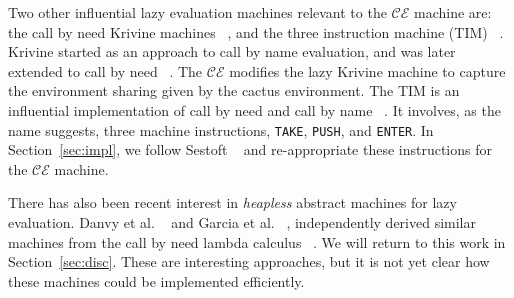 Two other influential lazy evaluation machines relevant to the $\mathcal{CE}$
machine are: the call by need Krivine machines ~\cite{lkm,
krivine2007call,sestoft}, and the three instruction machine (TIM) ~\cite{TIM}.
Krivine started as an approach to call by name evaluation, and was later
extended to call by need ~\cite{krivine2007call, sestoft, danvy2013synthetic,
lkm}.  The $\mathcal{CE}$  modifies the lazy Krivine machine to capture the
environment sharing given by the cactus environment. The TIM is an influential
implementation of call by need and call by name ~\cite{TIM}.  It involves, as
the name suggests, three machine instructions, \texttt{TAKE}, \texttt{PUSH}, and
\texttt{ENTER}. In Section~\ref{sec:impl}, we follow Sestoft ~\cite{sestoft} and
re-appropriate these instructions for the $\mathcal{CE}$ machine.

There has also been recent interest in \emph{heapless} abstract
machines for lazy evaluation. Danvy et al. ~\cite{danvy2012inter} and
Garcia et al.  ~\cite{garcia2009lazy}, independently derived similar
machines from the call by need lambda calculus
~\cite{ariola1995call}. We will return to this work in
Section~\ref{sec:disc}.  These are interesting approaches, but it is
not yet clear how these machines could be implemented efficiently.
